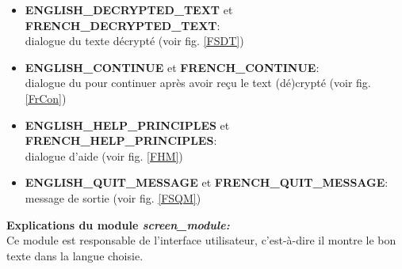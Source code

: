 \documentclass[a4paper,12pt,abstracton,titlepage]{scrartcl}
\begin{document}
{\begin{itemize}
dialogue du texte crypté (voir fig. \ref{FSCT})\\
\item \textbf{ENGLISH\_DECRYPTED\_TEXT} et \textbf{FRENCH\_DECRYPTED\_TEXT}:\\
dialogue du texte décrypté (voir fig. \ref{FSDT})\\
\item \textbf{ENGLISH\_CONTINUE} et \textbf{FRENCH\_CONTINUE}:\\
dialogue du pour continuer après avoir reçu le text (dé)crypté (voir fig. \ref{FrCon})\\
\item \textbf{ENGLISH\_HELP\_PRINCIPLES} et \textbf{FRENCH\_HELP\_PRINCIPLES}:\\
dialogue d'aide (voir fig. \ref{FHM})\\
\item \textbf{ENGLISH\_QUIT\_MESSAGE} et \textbf{FRENCH\_QUIT\_MESSAGE}:\\
message de sortie (voir fig. \ref{FSQM})\\
\end{itemize}


\textbf{Explications du module \textit{screen\_module:}}\\
Ce module est responsable de l'interface utilisateur, c'est-à-dire il montre le bon texte dans la langue choisie.
\vspace{0.3cm}

}
\end{document}
